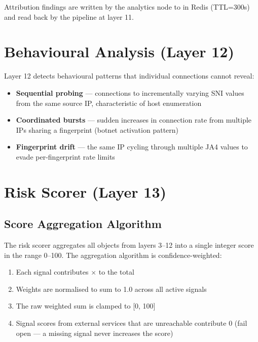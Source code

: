 Attribution findings are written by the analytics node to  in
Redis (TTL=300s) and read back by the pipeline at layer 11.

\section{Behavioural Analysis (Layer 12)}

Layer 12 detects behavioural patterns that individual connections cannot reveal:
\begin{itemize}
  \item \textbf{Sequential probing} — connections to incrementally varying SNI values
        from the same source IP, characteristic of host enumeration
  \item \textbf{Coordinated bursts} — sudden increases in connection rate from multiple
        IPs sharing a fingerprint (botnet activation pattern)
  \item \textbf{Fingerprint drift} — the same IP cycling through multiple JA4 values
        to evade per-fingerprint rate limits
\end{itemize}

\section{Risk Scorer (Layer 13)}

\subsection{Score Aggregation Algorithm}

The risk scorer aggregates all  objects from layers 3–12 into a
single integer score in the range 0–100. The aggregation algorithm is
confidence-weighted:

\begin{enumerate}
  \item Each signal contributes  $\times$  to the total
  \item Weights are normalised to sum to 1.0 across all active signals
  \item The raw weighted sum is clamped to [0, 100]
  \item Signal scores from external services that are unreachable contribute 0
        (fail open — a missing signal never increases the score)
\end{enumerate}

